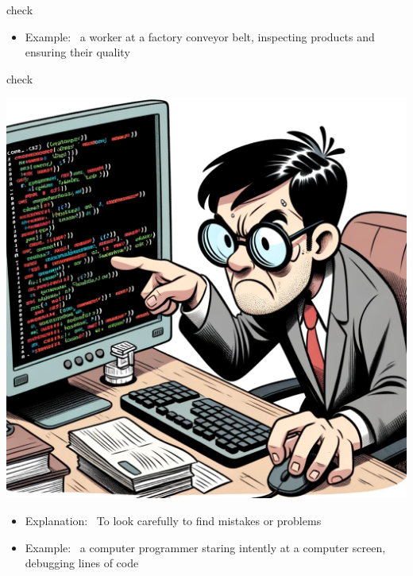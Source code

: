 \documentclass[avery5371, grid,frame]{flashcards}
\begin{document}
\begin{flashcard}{check}
\begin{center}
\begin{minipage}[c]{.45\textwidth}
\begin{itemize}
            \item Example: \ a worker at a factory conveyor belt, inspecting products and ensuring their quality
            \end{itemize}
        \end{minipage}
    \end{center}
    \vspace*{\fill}
\end{flashcard}\begin{flashcard}{check}
    \vspace*{\fill}
    \begin{center}
        \begin{minipage}[c]{.45\textwidth}
            \includegraphics[width=\textwidth]{cards/c/check/check - a computer programmer staring intently at a computer screen, debugging lines of code.png}
        \end{minipage}
        \begin{minipage}[c]{.45\textwidth}
            \begin{itemize}\setlength\itemsep{12pt}
            \item Explanation: \ To look carefully to find mistakes or problems

            \item Example: \ a computer programmer staring intently at a computer screen, debugging lines of code
            \end{itemize}
        \end{minipage}
    \end{center}
    \vspace*{\fill}
\end{flashcard}
\end{document}
